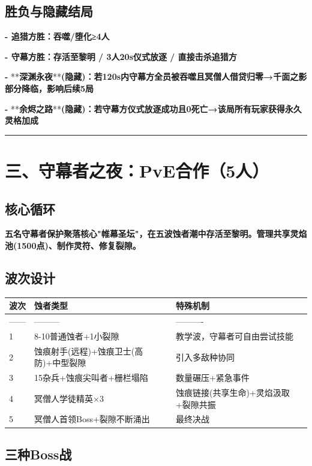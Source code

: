 \documentclass[12pt,a4paper,openany]{ctexbook}
\begin{document}
\section*{胜负与隐藏结局}


\textbf{- 追猎方胜：吞噬/堕化≥4人}

\textbf{- 守幕方胜：存活至黎明 / 3人20s仪式放逐 / 直接击杀追猎方}

\textbf{- }**\textbf{深渊永夜}**\textbf{(隐藏)：若120s内守幕方全员被吞噬且冥僧人借贷归零→千面之影部分降临，影响后续5局}

\textbf{- }**\textbf{余烬之路}**\textbf{(隐藏)：若守幕方仪式放逐成功且0死亡→该局所有玩家获得永久灵格加成}


\bigskip\hrule\bigskip


\chapter{三、守幕者之夜：PvE合作（5人）}


\section*{核心循环}


\textbf{五名守幕者保护聚落核心"帷幕圣坛"，在五波蚀者潮中存活至黎明。管理共享灵焰池(1500点)、制作灵符、修复裂隙。}


\section*{波次设计}


\begin{tabular}{|l|l|l|}
\hline
波次 & 蚀者类型 & 特殊机制 \\
\hline
------ & --------- & ---------- \\
1 & 8-10普通蚀者+1小裂隙 & 教学波，守幕者可自由尝试技能 \\
2 & 蚀痕射手(远程)+蚀痕卫士(高防)+中型裂隙 & 引入多敌种协同 \\
3 & 15杂兵+蚀痕尖叫者+栅栏塌陷 & 数量碾压+紧急事件 \\
4 & 冥僧人学徒精英×3 & 蚀痕链接(共享生命)+灵焰汲取+裂隙共振 \\
5 & 冥僧人首领Boss+裂隙不断涌出 & 最终决战 \\
\hline
\end{tabular}


\section*{三种Boss战}
\end{document}

